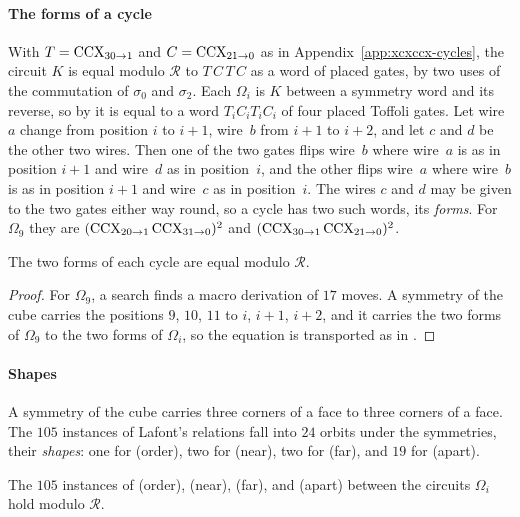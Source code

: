 \documentclass[acmsmall,screen,nonacm]{acmart}
\begin{document}
\paragraph{The forms of a cycle} With $T=\mathrm{CCX}_{30\to1}$ and $C=\mathrm{CCX}_{21\to0}$ as in Appendix~\ref{app:xcxccx-cycles}, the circuit $K$ is equal modulo $\mathcal{R}$ to $T\,C\,T\,C$ as a word of placed gates, by two uses of the commutation of $\sigma_0$ and $\sigma_2$. Each $\Omega_i$ is $K$ between a symmetry word and its reverse, so by  it is equal to a word $T_iC_iT_iC_i$ of four placed Toffoli gates. Let wire~$a$ change from position $i$ to $i+1$, wire~$b$ from $i+1$ to $i+2$, and let $c$ and $d$ be the other two wires. Then one of the two gates flips wire~$b$ where wire~$a$ is as in position $i+1$ and wire~$d$ as in position~$i$, and the other flips wire~$a$ where wire~$b$ is as in position $i+1$ and wire~$c$ as in position~$i$. The wires $c$ and $d$ may be given to the two gates either way round, so a cycle has two such words, its \emph{forms}. For $\Omega_9$ they are $(\mathrm{CCX}_{20\to1}\,\mathrm{CCX}_{31\to0})^2$ and $(\mathrm{CCX}_{30\to1}\,\mathrm{CCX}_{21\to0})^2$.

\begin{lemma}\label{lem:x-forms}
The two forms of each cycle are equal modulo $\mathcal{R}$.
\end{lemma}

\begin{proof}
For $\Omega_9$, a search finds a macro derivation of $17$ moves. A symmetry of the cube carries the positions $9$, $10$, $11$ to $i$, $i+1$, $i+2$, and it carries the two forms of $\Omega_9$ to the two forms of $\Omega_i$, so the equation is transported as in .
\end{proof}

\paragraph{Shapes} A symmetry of the cube carries three corners of a face to three corners of a face. The $105$ instances of Lafont's relations fall into $24$ orbits under the symmetries, their \emph{shapes}: one for (order), two for (near), two for (far), and $19$ for (apart).

\begin{proposition}\label{prop:x-relations}
The $105$ instances of \textup{(order)}, \textup{(near)}, \textup{(far)}, and \textup{(apart)} between the circuits $\Omega_i$ hold modulo $\mathcal{R}$.
\end{proposition}
\end{document}

